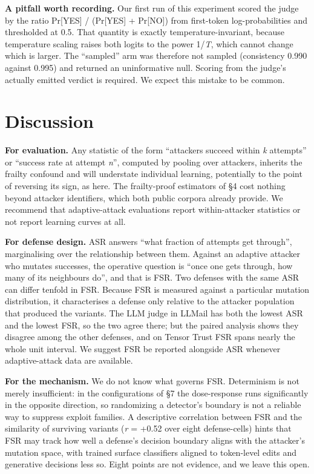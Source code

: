 \documentclass[conference]{IEEEtran}
\begin{document}
\textbf{A pitfall worth recording.} Our first run of this experiment scored the judge by the ratio Pr[YES] / (Pr[YES] + Pr[NO]) from first-token log-probabilities and thresholded at 0.5. That quantity is exactly temperature-invariant, because temperature scaling raises both logits to the power 1/\textit{T}, which cannot change which is larger. The ``sampled'' arm was therefore not sampled (consistency 0.990 against 0.995) and returned an uninformative null. Scoring from the judge's actually emitted verdict is required. We expect this mistake to be common.


\section{Discussion}

\textbf{For evaluation.} Any statistic of the form ``attackers succeed within \textit{k} attempts'' or ``success rate at attempt \textit{n}'', computed by pooling over attackers, inherits the frailty confound and will understate individual learning, potentially to the point of reversing its sign, as here. The frailty-proof estimators of \S4 cost nothing beyond attacker identifiers, which both public corpora already provide. We recommend that adaptive-attack evaluations report within-attacker statistics or not report learning curves at all.

\textbf{For defense design.} ASR answers ``what fraction of attempts get through'', marginalising over the relationship between them. Against an adaptive attacker who mutates successes, the operative question is ``once one gets through, how many of its neighbours do'', and that is FSR. Two defenses with the same ASR can differ tenfold in FSR. Because FSR is measured against a particular mutation distribution, it characterises a defense only relative to the attacker population that produced the variants. The LLM judge in LLMail has both the lowest ASR and the lowest FSR, so the two agree there; but the paired analysis shows they disagree among the other defenses, and on Tensor Trust FSR spans nearly the whole unit interval. We suggest FSR be reported alongside ASR whenever adaptive-attack data are available.

\textbf{For the mechanism.} We do not know what governs FSR. Determinism is not merely insufficient: in the configurations of \S7 the dose-response runs significantly in the opposite direction, so randomizing a detector's boundary is not a reliable way to suppress exploit families. A descriptive correlation between FSR and the similarity of surviving variants (\textit{r} = +0.52 over eight defense-cells) hints that FSR may track how well a defense's decision boundary aligns with the attacker's mutation space, with trained surface classifiers aligned to token-level edits and generative decisions less so. Eight points are not evidence, and we leave this open.
\end{document}
